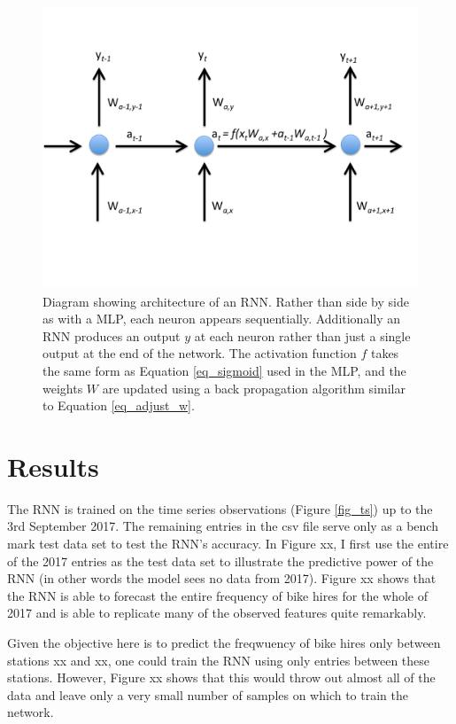 \documentclass[10pt]{article}
\begin{document}
\begin{figure}
\includegraphics[scale=0.5,angle=0,trim=0cm 0cm 0.0cm 0cm]{rnn.pdf}
\caption{Diagram showing architecture of an RNN. Rather than side by side as with a MLP, each neuron appears sequentially. Additionally an RNN produces an output $y$ at each neuron rather than just a single output at the end of the network. The activation function $f$ takes the same form as Equation \ref{eq_sigmoid} used in the MLP, and the weights $W$ are updated using a back propagation algorithm similar to Equation \ref{eq_adjust_w}.}
\label{fig_rnn}
\end{figure}


\section{Results}
\label{sec_results}
The RNN is trained on the time series observations (Figure \ref{fig_ts}) up to the 3rd September 2017. The remaining entries in the csv file serve only as a bench mark test data set to test the RNN's accuracy. In Figure xx, I first use the entire of the 2017 entries as the test data set to illustrate the predictive power of the RNN (in other words the model sees no data from 2017). Figure xx shows that the RNN is able to forecast the entire frequency of bike hires for the whole of 2017 and is able to replicate many of the observed features quite remarkably.




Given the objective here is to predict the freqwuency of bike hires only between stations xx and xx, one could train the RNN using only entries between these stations. However, Figure xx shows that this would throw out almost all of the data and leave only a very small number of samples on which to train the network. 
\end{document}
